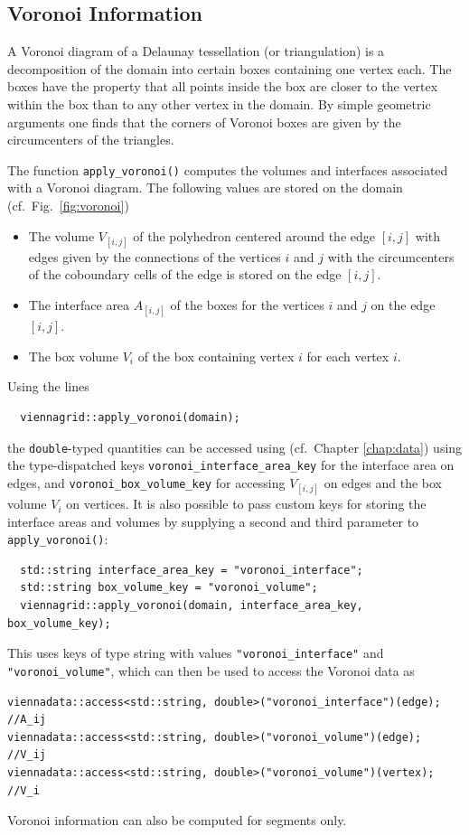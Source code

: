  \subsection{Voronoi Information}
 A Voronoi diagram of a Delaunay tessellation (or triangulation) is a decomposition of the domain into certain boxes containing one vertex each.
 The boxes have the property that all points inside the box are closer to the vertex within the box than to any other vertex in the domain. 
 By simple geometric arguments one finds that the corners of Voronoi boxes are given by the circumcenters of the triangles.

 The function \lstinline|apply_voronoi()| computes the volumes and interfaces associated with a Voronoi diagram. The following values are stored on the domain (cf.~Fig.~\ref{fig:voronoi})
 \begin{itemize}
  \item The volume $V_{[i,j]}$ of the polyhedron centered around the edge $[i,j]$ with edges given by the connections of the vertices $i$ and $j$ with the circumcenters of the coboundary cells of the edge is stored on the edge $[i,j]$.
  \item The interface area $A_{[i,j]}$ of the boxes for the vertices $i$ and $j$ on the edge $[i,j]$.
  \item The box volume $V_i$ of the box containing vertex $i$ for each vertex $i$.
 \end{itemize}
 Using the lines
 \begin{lstlisting}
  viennagrid::apply_voronoi(domain);
 \end{lstlisting}
 the \lstinline|double|-typed quantities can be accessed using {\ViennaData} (cf.~Chapter \ref{chap:data}) using the type-dispatched keys \lstinline|voronoi_interface_area_key| for the interface area on edges, and \lstinline|voronoi_box_volume_key| for accessing $V_{[i,j]}$ on edges and the box volume $V_i$ on vertices.
 It is also possible to pass custom keys for storing the interface areas and volumes by supplying a second and third parameter to \lstinline|apply_voronoi()|:
 \begin{lstlisting}
  std::string interface_area_key = "voronoi_interface";
  std::string box_volume_key = "voronoi_volume";
  viennagrid::apply_voronoi(domain, interface_area_key, box_volume_key);
 \end{lstlisting}
 This uses keys of type string with values \lstinline|"voronoi_interface"| and \lstinline|"voronoi_volume"|, which can then be used to access the Voronoi data as
 \begin{lstlisting}
viennadata::access<std::string, double>("voronoi_interface")(edge); //A_ij
viennadata::access<std::string, double>("voronoi_volume")(edge);    //V_ij
viennadata::access<std::string, double>("voronoi_volume")(vertex);  //V_i
 \end{lstlisting}
Voronoi information can also be computed for segments only.


